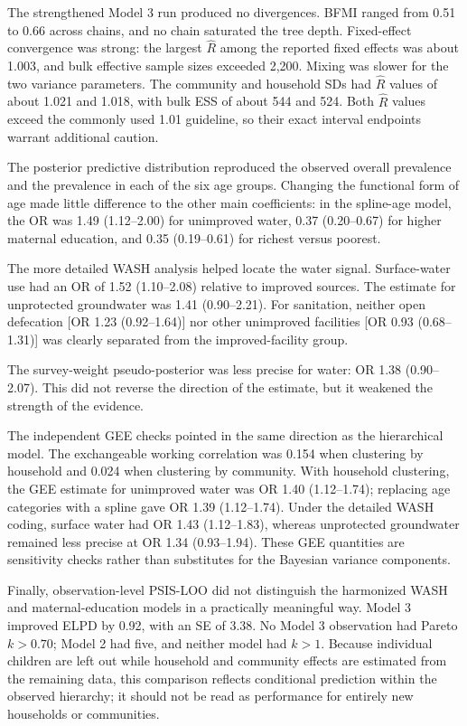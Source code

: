 \documentclass[11pt]{article}
\begin{document}
The strengthened Model 3 run produced no divergences. BFMI ranged from 0.51 to 0.66 across chains, and no chain saturated the tree depth. Fixed-effect convergence was strong: the largest $\hat R$ among the reported fixed effects was about 1.003, and bulk effective sample sizes exceeded 2,200. Mixing was slower for the two variance parameters. The community and household SDs had $\hat R$ values of about 1.021 and 1.018, with bulk ESS of about 544 and 524. Both $\hat R$ values exceed the commonly used 1.01 guideline, so their exact interval endpoints warrant additional caution.

The posterior predictive distribution reproduced the observed overall prevalence and the prevalence in each of the six age groups. Changing the functional form of age made little difference to the other main coefficients: in the spline-age model, the OR was 1.49 (1.12--2.00) for unimproved water, 0.37 (0.20--0.67) for higher maternal education, and 0.35 (0.19--0.61) for richest versus poorest.

The more detailed WASH analysis helped locate the water signal. Surface-water use had an OR of 1.52 (1.10--2.08) relative to improved sources. The estimate for unprotected groundwater was 1.41 (0.90--2.21). For sanitation, neither open defecation [OR 1.23 (0.92--1.64)] nor other unimproved facilities [OR 0.93 (0.68--1.31)] was clearly separated from the improved-facility group.

The survey-weight pseudo-posterior was less precise for water: OR 1.38 (0.90--2.07). This did not reverse the direction of the estimate, but it weakened the strength of the evidence.

The independent GEE checks pointed in the same direction as the hierarchical model. The exchangeable working correlation was 0.154 when clustering by household and 0.024 when clustering by community. With household clustering, the GEE estimate for unimproved water was OR 1.40 (1.12--1.74); replacing age categories with a spline gave OR 1.39 (1.12--1.74). Under the detailed WASH coding, surface water had OR 1.43 (1.12--1.83), whereas unprotected groundwater remained less precise at OR 1.34 (0.93--1.94). These GEE quantities are sensitivity checks rather than substitutes for the Bayesian variance components.

Finally, observation-level PSIS-LOO did not distinguish the harmonized WASH and maternal-education models in a practically meaningful way. Model 3 improved ELPD by 0.92, with an SE of 3.38. No Model 3 observation had Pareto $k>0.70$; Model 2 had five, and neither model had $k>1$. Because individual children are left out while household and community effects are estimated from the remaining data, this comparison reflects conditional prediction within the observed hierarchy; it should not be read as performance for entirely new households or communities.
\end{document}
